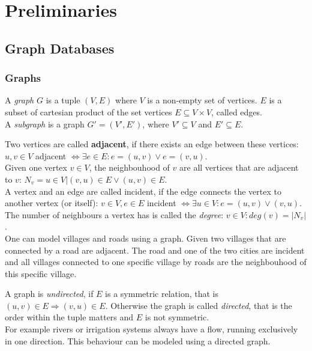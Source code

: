 \chapter{Preliminaries}\label{\positionnumber}

\section{Graph Databases}\label{\positionnumber}
        \subsection{Graphs}\label{\positionnumber}
            A \textit{graph} $G$ is a tuple $(V, E)$ where $V$ is a non-empty set of vertices. $E$ is a subset of cartesian product of the set vertices $E \subseteq V \times V$, called edges. \\
            A \textit{subgraph} is a graph $G' = (V', E')$, where $V' \subseteq V$ and $E' \subseteq E$.
            
            Two vertices are called \textbf{adjacent}, if there exists an edge between these vertices: $u,v \in V$ adjacent $\Leftrightarrow \exists e \in E: e = (u, v) \vee e= (v, u)$. \\
            Given one vertex $v \in V$, the neighbouhood of $v$ are all vertices that are adjacent to $v$: $N_v = {u \in V | (v, u) \in E \vee (u, v) \in E}$. \\
            A vertex and an edge are called incident, if the edge connects the vertex to another vertex (or itself): $v \in V, e\in E$ incident $\Leftrightarrow \exists u \in V: e = (u,v) \vee (v,u)$. The number of neighbours a vertex has is called the \textit{degree}: $v \in V: deg(v) = |N_v|$. \\
            One can model villages and roads using a graph. Given two villages that are connected by a road are adjacent. The road and one of the two cities are incident and all villages connected to one specific village by roads are the neighbouhood of this specific village. 
            
            A graph is \textit{undirected}, if $E$ is a symmetric relation, that is $(u, v) \in E \Rightarrow (v, u) \in E$.
            Otherwise the graph is called \textit{directed}, that is the order within the tuple matters and $E$ is not symmetric. \\
            For example rivers or irrigation systems always have a flow, running exclusively in one direction. This behaviour can be modeled using a directed graph.
            
